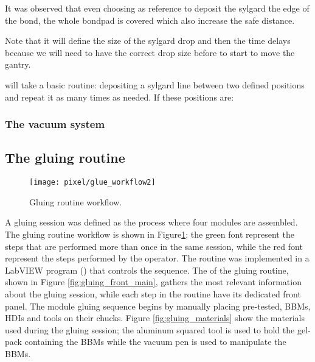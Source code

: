 It was observed that even choosing as reference to deposit the sylgard the edge of the bond, the whole bondpad is covered which also increase the safe distance.

Note that it will define the size of the sylgard drop and then the time delays because we will need to have the correct drop size before to start to move the gantry.






will take a basic routine: depositing a sylgard line between two defined positions and repeat it
as many times as needed. If these positions are:





\subsubsection*{The vacuum system}






\subsection{The gluing routine}

\begin{figure}[h]
  \begin{center}
    \texttt{[image: pixel/glue\_workflow2]}
    \caption[Gluing routine workflow.]{Gluing routine workflow.}\label{fig:glue_workflow}
  \end{center}
\end{figure}

A gluing session was defined as the process where four modules are assembled. The gluing routine workflow is shown in Figure\ref{fig:glue_workflow}; the green font represent the steps that are performed more than once in the same session, while the red font represent the steps performed by the operator. The routine was implemented in a LabVIEW program () that controls the sequence. The  of the gluing routine, shown in Figure \ref{fig:gluing_front_main}, gathers the most relevant information about the gluing session, while each step in the routine have its dedicated front panel. The module gluing sequence begins by manually placing pre-tested, BBMs, HDIs and tools on their chucks. Figure \ref{fig:gluing_materials} show the materials used during the gluing session; the aluminum squared tool is used to hold the gel-pack containing the BBMs while the vacuum pen is used to manipulate the BBMs.

